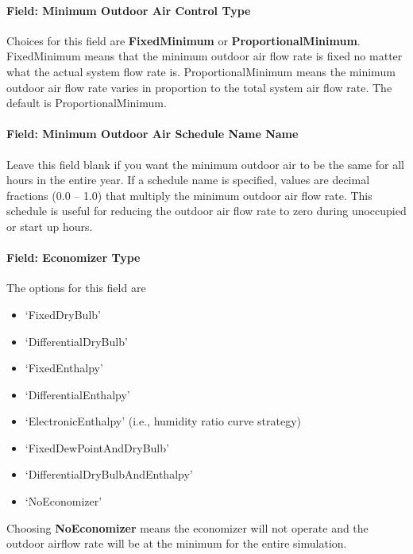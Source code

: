 \paragraph{Field: Minimum Outdoor Air Control Type}\label{field-minimum-outdoor-air-control-type}

Choices for this field are \textbf{FixedMinimum} or \textbf{ProportionalMinimum}. FixedMinimum means that the minimum outdoor air flow rate is fixed no matter what the actual system flow rate is. ProportionalMinimum means the minimum outdoor air flow rate varies in proportion to the total system air flow rate. The default is ProportionalMinimum.

\paragraph{Field: Minimum Outdoor Air Schedule Name Name}\label{field-minimum-outdoor-air-schedule-name-name}

Leave this field blank if you want the minimum outdoor air to be the same for all hours in the entire year. If a schedule name is specified, values are decimal fractions (0.0 -- 1.0) that multiply the minimum outdoor air flow rate. This schedule is useful for reducing the outdoor air flow rate to zero during unoccupied or start up hours.

\paragraph{Field: Economizer Type}\label{field-economizer-type-3}

The options for this field are

\begin{itemize}
\item
  `FixedDryBulb'
\item
  `DifferentialDryBulb'
\item
  `FixedEnthalpy'
\item
  `DifferentialEnthalpy'
\item
  `ElectronicEnthalpy' (i.e., humidity ratio curve strategy)
\item
  `FixedDewPointAndDryBulb'
\item
  `DifferentialDryBulbAndEnthalpy'
\item
  `NoEconomizer'
\end{itemize}

Choosing \textbf{NoEconomizer} means the economizer will not operate and the outdoor airflow rate will be at the minimum for the entire simulation.

